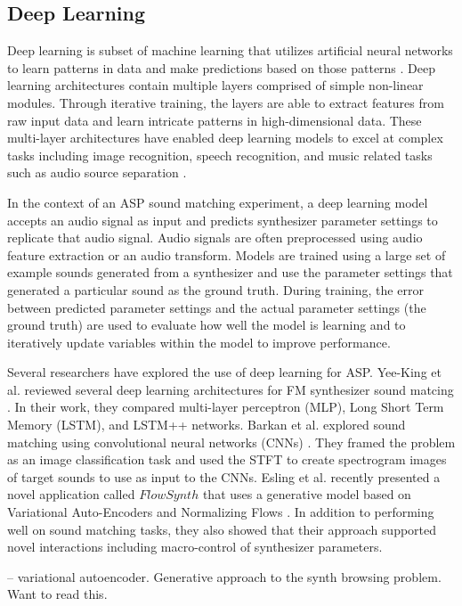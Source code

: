 \subsection{Deep Learning}
Deep learning is subset of machine learning that utilizes artificial neural networks to learn patterns in data and make predictions based on those patterns \cite{lecun2015deep}. Deep learning architectures contain multiple layers comprised of simple non-linear modules. Through iterative training, the layers are able to extract features from raw input data and learn intricate patterns in high-dimensional data. These multi-layer architectures have enabled deep learning models to excel at complex tasks including image recognition, speech recognition, and music related tasks such as audio source separation \cite{spleeter2019}.

In the context of an ASP sound matching experiment, a deep learning model accepts an audio signal as input and predicts synthesizer parameter settings to replicate that audio signal. Audio signals are often preprocessed using audio feature extraction or an audio transform. Models are trained using a large set of example sounds generated from a synthesizer and use the parameter settings that generated a particular sound as the ground truth. During training, the error between predicted parameter settings and the actual parameter settings (the ground truth) are used to evaluate how well the model is learning and to iteratively update variables within the model to improve performance. 

Several researchers have explored the use of deep learning for ASP. Yee-King et al. reviewed several deep learning architectures for FM synthesizer sound matcing \cite{yee2018automatic}. In their work, they compared multi-layer perceptron (MLP), Long Short Term Memory (LSTM), and LSTM++ networks. Barkan et al. explored sound matching using convolutional neural networks (CNNs) \cite{barkan2019deep, barkan2019inversynth}. They framed the problem as an image classification task and used the STFT to create spectrogram images of target sounds to use as input to the CNNs. Esling et al. recently presented a novel application called $FlowSynth$ that uses a generative model based on Variational Auto-Encoders and Normalizing Flows \cite{esling2020flow}. In addition to performing well on sound matching tasks, they also showed that their approach supported novel interactions including macro-control of synthesizer parameters.

\cite{le2021improving} -- variational autoencoder. Generative approach to the synth browsing problem. Want to read this.

